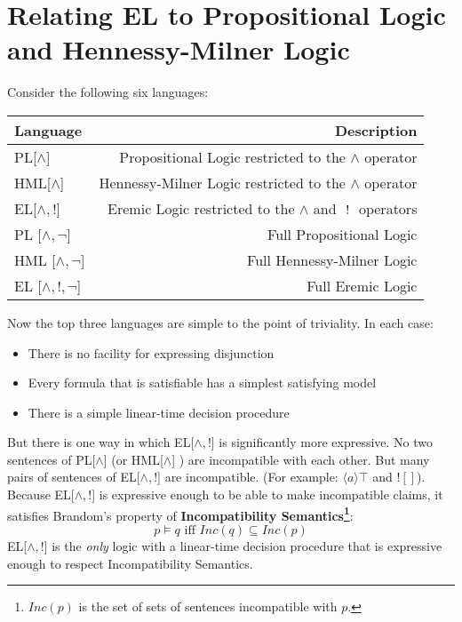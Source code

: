 \section{Relating EL to Propositional Logic and Hennessy-Milner Logic}
Consider the following six languages:
\begin{center}
\begin{tabular}{ l | r }
Language & Description \\
\hline
PL[$\land$] & Propositional Logic restricted to the $\land$ operator \\
HML[$\land$] & Hennessy-Milner Logic restricted to the $\land$ operator \\
EL[$\land, !$] & Eremic Logic restricted to the $\land$ and $\ ! \ $ operators \\
PL [$\land, \neg$] & Full Propositional Logic \\
HML [$\land, \neg$] & Full Hennessy-Milner Logic \\
EL [$\land, !, \neg$] & Full Eremic Logic \\
\end{tabular}
\end{center}
Now the top three languages are simple to the point of triviality. In each case:
\begin{itemize}
\item
There is no facility for expressing disjunction
\item
Every formula that is satisfiable has a simplest satisfying model
\item
There is a simple linear-time decision procedure
\end{itemize}
But there is one way in which EL[$\land, !$]  is significantly more expressive.
No two sentences of PL[$\land$] (or HML[$\land$] ) are incompatible with each other. 
But many pairs of sentences of EL[$\land, !$] are incompatible.
(For example: $\langle a \rangle \top$ and $! []$). 
Because EL[$\land, !$]  is expressive enough to be able to make incompatible claims, it satisfies Brandom's property of {\bf Incompatibility Semantics\footnote{$Inc(p)$ is the set of sets of sentences incompatible with $p$.}}:
\[
p \models q \mbox{ iff } Inc(q) \subseteq Inc(p)
\]
EL[$\land, !$]  is the \emph{only} logic with a linear-time decision procedure that is expressive enough to respect Incompatibility Semantics.

